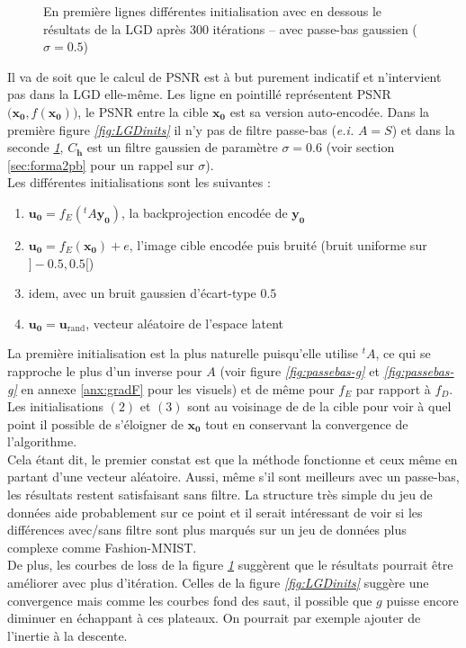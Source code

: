 \documentclass[hidelinks, french]{article} %
\newcommand{\ei}{\textit{e.i. }}
\renewcommand{\bf}[1]{\boldsymbol{#1}}
\theoremstyle{enonce}
\theoremstyle{special}
\theoremstyle{rq}
\theoremstyle{exo}
\theoremstyle{demo}
\begin{document}
\begin{figure}[H]\centering
    
    \caption{En première lignes différentes initialisation avec en dessous le résultats de la LGD après 300 itérations --  avec passe-bas gaussien ($\sigma=0.5$)}
    \label{fig:LGDinitg}
\end{figure}

Il va de soit que le calcul de PSNR est à but purement indicatif et n'intervient pas dans la LGD elle-même. Les ligne en pointillé représentent PSNR$\big(\bf{x_0},f(\bf{x_0})\big)$, le PSNR entre la cible $\bf{x_0}$ est sa version auto-encodée.
Dans la première figure \textit{\ref{fig:LGDinits}} il n'y pas de filtre passe-bas (\ei $A=S$) et dans la seconde \textit{\ref{fig:LGDinitg}}, $C_{\bf{h}}$ est un filtre gaussien de paramètre $\sigma=0.6$ (voir section \ref{sec:forma2pb} pour un rappel sur $\sigma$).
\\
Les différentes initialisations sont les suivantes :
\begin{enumerate}[label=(\arabic*)]
    \item $\bf{u_0}=f_E(^tA\bf{y_0})$, la backprojection encodée de $\bf{y_0}$
    \item $\bf{u_0}=f_E(\bf{x_0})+e$, l'image cible encodée puis bruité (bruit uniforme sur $]-0.5,0.5[$)
    \item idem, avec un bruit gaussien d'écart-type $0.5$
    \item $\bf{u_0}=\bf{u}_{\text{rand}}$,  vecteur aléatoire de l'espace latent
\end{enumerate}

\noindent La première initialisation est la plus naturelle puisqu'elle utilise $^tA$, ce qui se rapproche le plus d'un inverse pour $A$ (voir figure \textit{\ref{fig:passebas-g}} et \textit{\ref{fig:passebas-g}} en annexe \ref{anx:gradF} pour les visuels) et de même pour $f_E$ par rapport à $f_D$. 
\\
Les initialisations $(2)$ et $(3)$ sont au voisinage de de la cible  pour voir à quel point il possible de s'éloigner de $\bf{x_0}$ tout en conservant la convergence de l'algorithme.
\\

Cela étant dit, le premier constat est que la méthode fonctionne et ceux même en partant d'une vecteur aléatoire.  Aussi, même s'il sont meilleurs avec un passe-bas, les résultats restent satisfaisant sans filtre. La structure très simple du jeu de données aide probablement sur ce point et il serait intéressant de voir si les différences avec/sans filtre sont plus marqués sur un jeu de données plus complexe comme Fashion-MNIST.
\\
De plus, les courbes de loss de la figure \textit{\ref{fig:LGDinitg}} suggèrent que le résultats pourrait être améliorer avec plus d'itération. Celles de la figure \textit{\ref{fig:LGDinits}} suggère une convergence mais comme  les courbes fond des saut, il possible que $g$ puisse encore diminuer en échappant à ces plateaux. On pourrait par exemple ajouter de l'inertie à la descente.
\\
\end{document}
